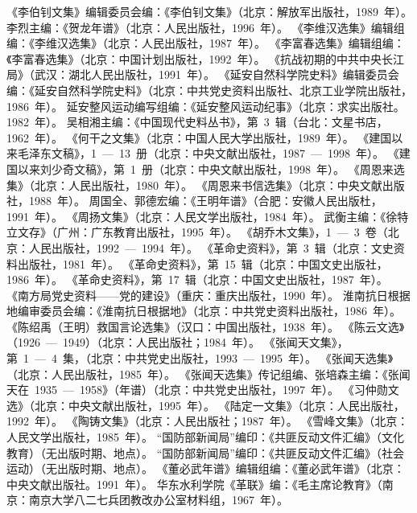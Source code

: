 \begin{thebibliography}{999}
\bibitem{}《李伯钊文集》编辑委员会编：《李伯钊文集》（北京：解放军出版社，1989~年）。
\bibitem{}李烈主编：《贺龙年谱》（北京：人民出版社，1996~年）。
\bibitem{}《李维汉选集》编辑组编：《李维汉选集》（北京：人民出版社，1987~年）。
\bibitem{}《李富春选集》编辑组编：《李富春选集》（北京：中国计划出版社，1992~年）。
\bibitem{}《抗战初期的中共中央长江局》（武汉：湖北人民出版社，1991~年）。
\bibitem{}《延安自然科学院史料》编辑委员会编：《延安自然科学院史料》（北京：中共党史资料出版社、北京工业学院出版社，1986~年）。
\bibitem{}延安整风运动编写组编：《延安整风运动纪事》（北京：求实出版社。1982~年）。
\bibitem{}吴相湘主编：《中国现代史料丛书》，第~3~辑（台北：文星书店，1962~年）。
\bibitem{}《何干之文集》（北京：中国人民大学出版社，1989~年）。
\bibitem{}《建国以来毛泽东文稿》，1~—~13~册（北京：中央文献出版社，1987~—~1998~年）。
\bibitem{}《建国以来刘少奇文稿》，第~1~册（北京：中央文献出版社，1998~年）。
\bibitem{}《周恩来选集》（北京：人民出版社，1980~年）。
\bibitem{}《周恩来书信选集》（北京：中央文献出版社，1988~年）。
\bibitem{}周国全、郭德宏编：《王明年谱》（合肥：安徽人民出版杜，1991~年）。
\bibitem{}《周扬文集》（北京：人民文学出版社，1984~年）。
\bibitem{}武衡主编：《徐特立文存》（广州：广东教育出版社，1995~年）。
\bibitem{}《胡乔木文集》，1~—~3~卷（北京：人民出版社，1992~—~1994~年）。
\bibitem{}《革命史资料》，第~3~辑（北京：文史资料出版社，1981~年）。
\bibitem{}《革命史资料》，第~15~辑（北京：中国文史出版社，1986~年）。
\bibitem{}《革命史资料》，第~17~辑（北京：中国文史出版社，1987~年）。
\bibitem{}《南方局党史资料——党的建设》（重庆：重庆出版社，1990~年）。
\bibitem{}淮南抗日根据地编审委员会编：《淮南抗日根据地》（北京：中共党史资料出版社，1986~年）。
\bibitem{}《陈绍禹（王明）救国言论选集》（汉口：中国出版社，1938~年）。
\bibitem{}《陈云文选》（1926~—~1949）（北京：人民出版社；1984~年）。
\bibitem{}《张闻天文集》，第~1~—~4~集，（北京：中共党史出版社，1993~—~1995~年）。
\bibitem{}《张闻天选集》（北京：人民出版社，1985~年）。
\bibitem{}《张闻天选集》传记组编、张培森主编：《张闻天在~1935~—~1958》（年谱）（北京：中共党史出版社，1997~年）。
\bibitem{}《习仲勋文选》（北京：中央文献出版社，1995~年）。
\bibitem{}《陆定一文集》（北京：人民出版社，1992~年）。
\bibitem{}《陶铸文集》（北京：人民出版社；1987~年）。
\bibitem{}《雪峰文集》（北京：人民文学出版社，1985~年）。
\bibitem{}“国防部新闻局”编印：《共匪反动文件汇编》（文化教育）（无出版时期、地点）。
\bibitem{}“国防部新闻局”编印：《共匪反动文件汇编》（社会运动）（无出版时期、地点）。
\bibitem{}《董必武年谱》编辑组编：《董必武年谱》（北京：中央文献出版社。1991~年）。
\bibitem{}华东水利学院《革联》编：《毛主席论教育》（南京：南京大学八二七兵团教改办公室材料组，1967~年）。

\end{thebibliography}
